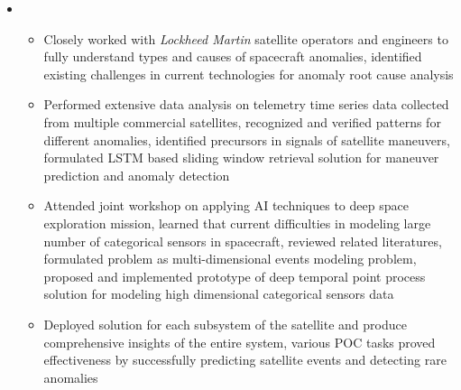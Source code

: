 \documentclass[11pt,a4paper,sans]{moderncv}        %
\begin{document}
\vspace{4pt}

\begin{itemize}

	\item{
		{\vspace{3pt}
			\begin{itemize}
				\item Closely worked with \emph{Lockheed Martin} satellite operators and engineers to fully understand  types and causes of spacecraft anomalies, identified existing challenges in current technologies for anomaly root cause analysis
				\item Performed extensive data analysis on telemetry time series data collected from multiple commercial satellites, recognized and verified patterns for different anomalies, identified precursors in signals of satellite maneuvers, formulated LSTM based sliding window retrieval solution for maneuver prediction and anomaly detection
				\item Attended joint workshop on applying AI techniques to deep space exploration mission, learned that current difficulties in modeling large number of categorical sensors in spacecraft, reviewed related literatures, formulated problem as multi-dimensional events modeling problem, proposed and implemented prototype of deep temporal point process solution for modeling high dimensional categorical sensors data
				\item Deployed solution for each subsystem of the satellite and produce comprehensive insights of the entire system, various POC tasks proved effectiveness by successfully predicting satellite events and detecting rare anomalies
			\end{itemize}}}


\end{itemize}
\end{document}
